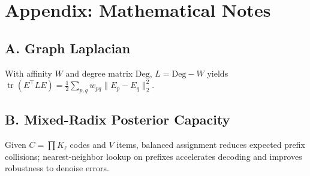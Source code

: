 \documentclass[11pt]{article}
\begin{document}
\section*{Appendix: Mathematical Notes}
\subsection*{A. Graph Laplacian}
With affinity $W$ and degree matrix $\mathrm{Deg}$, $L{=}\mathrm{Deg}{-}W$ yields $\operatorname{tr}(E^\top L E){=}\tfrac{1}{2}\sum_{p,q}w_{pq}\|E_p{-}E_q\|_2^2$.

\subsection*{B. Mixed-Radix Posterior Capacity}
Given $C{=}\prod K_\ell$ codes and $V$ items, balanced assignment reduces expected prefix collisions; nearest-neighbor lookup on prefixes accelerates decoding and improves robustness to denoise errors.
\end{document}
